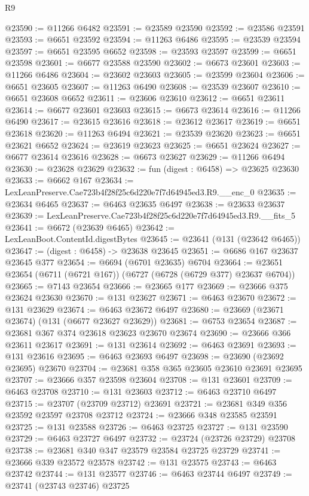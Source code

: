 \begin{lexlean}{R9}
\begin{coremodule}
@23590 := @11266 @6482
@23591 := @23589 @23590
@23592 := @23586 @23591
@23593 := @6651 @23592
@23594 := @11263 @6486
@23595 := @23539 @23594
@23597 := @6651 @23595 @6652
@23598 := @23593 @23597
@23599 := @6651 @23598
@23601 := @6677 @23588 @23590
@23602 := @6673 @23601
@23603 := @11266 @6486
@23604 := @23602 @23603
@23605 := @23599 @23604
@23606 := @6651 @23605
@23607 := @11263 @6490
@23608 := @23539 @23607
@23610 := @6651 @23608 @6652
@23611 := @23606 @23610
@23612 := @6651 @23611
@23614 := @6677 @23601 @23603
@23615 := @6673 @23614
@23616 := @11266 @6490
@23617 := @23615 @23616
@23618 := @23612 @23617
@23619 := @6651 @23618
@23620 := @11263 @6494
@23621 := @23539 @23620
@23623 := @6651 @23621 @6652
@23624 := @23619 @23623
@23625 := @6651 @23624
@23627 := @6677 @23614 @23616
@23628 := @6673 @23627
@23629 := @11266 @6494
@23630 := @23628 @23629
@23632 := fun (digest : @6458) => @23625 @23630
@23633 := @6662 @167
@23634 := LexLeanPreserve.Cae723b4f28f25c6d220e7f7d64945ed3.R9.__enc_0
@23635 := @23634 @6465
@23637 := @6463 @23635 @6497
@23638 := @23633 @23637
@23639 := LexLeanPreserve.Cae723b4f28f25c6d220e7f7d64945ed3.R9.__fits_5
@23641 := @6672 (@23639 @6465)
@23642 := LexLeanBoot.ContentId.digestBytes
@23645 := @23641 (@131 (@23642 @6465))
@23647 := (digest : @6458) -> @23638 @23645
@23651 := @6686 @167 @23637 @23645 @377
@23654 := @6694 (@6701 @23635) @6704
@23664 := @23651 @23654 (@6711 (@6721 @167)) (@6727 (@6728 (@6729 @377) @23637 @6704))
@23665 := @7143 @23654
@23666 := @23665 @177
@23669 := @23666 @375 @23624 @23630
@23670 := @131 @23627
@23671 := @6463 @23670
@23672 := @131 @23629
@23674 := @6463 @23672 @6497
@23680 := @23669 (@23671 @23674) (@131 (@6677 @23627 @23629))
@23681 := @6753 @23654
@23687 := @23681 @367 @374 @23618 @23623 @23670 @23674
@23690 := @23666 @366 @23611 @23617
@23691 := @131 @23614
@23692 := @6463 @23691
@23693 := @131 @23616
@23695 := @6463 @23693 @6497
@23698 := @23690 (@23692 @23695) @23670
@23704 := @23681 @358 @365 @23605 @23610 @23691 @23695
@23707 := @23666 @357 @23598 @23604
@23708 := @131 @23601
@23709 := @6463 @23708
@23710 := @131 @23603
@23712 := @6463 @23710 @6497
@23715 := @23707 (@23709 @23712) @23691
@23721 := @23681 @349 @356 @23592 @23597 @23708 @23712
@23724 := @23666 @348 @23585 @23591
@23725 := @131 @23588
@23726 := @6463 @23725
@23727 := @131 @23590
@23729 := @6463 @23727 @6497
@23732 := @23724 (@23726 @23729) @23708
@23738 := @23681 @340 @347 @23579 @23584 @23725 @23729
@23741 := @23666 @339 @23572 @23578
@23742 := @131 @23575
@23743 := @6463 @23742
@23744 := @131 @23577
@23746 := @6463 @23744 @6497
@23749 := @23741 (@23743 @23746) @23725

\end{coremodule}
\end{lexlean}
